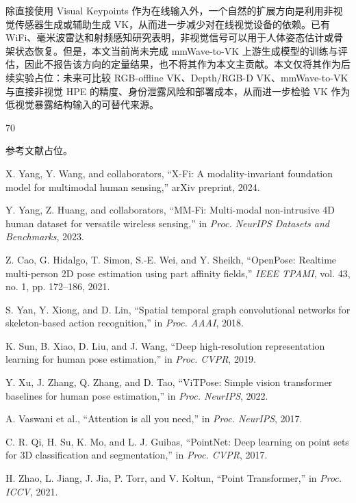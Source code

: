 \documentclass[journal]{IEEEtran}
\newcommand{\parahead}[1]{\vspace{0.4em}\noindent{\textbf{#1}}}
\begin{document}
\parahead{mmWave-to-VK 可行性占位实验。}
除直接使用 Visual Keypoints 作为在线输入外，一个自然的扩展方向是利用非视觉传感器生成或辅助生成 VK，从而进一步减少对在线视觉设备的依赖。已有 WiFi、毫米波雷达和射频感知研究表明，非视觉信号可以用于人体姿态估计或骨架状态恢复\cite{metafi,virteach,adapose,robustwifi,rfpose,mmwaveHar}。但是，本文当前尚未完成 mmWave-to-VK 上游生成模型的训练与评估，因此不报告该方向的定量结果，也不将其作为本文主贡献。本文仅将其作为后续实验占位：未来可比较 RGB-offline VK、Depth/RGB-D VK、mmWave-to-VK 与直接非视觉 HPE 的精度、身份泄露风险和部署成本，从而进一步检验 VK 作为低视觉暴露结构输入的可替代来源。

\begin{thebibliography}{70}

参考文献占位。

X. Yang, Y. Wang, and collaborators, ``X-Fi: A modality-invariant foundation model for multimodal human sensing,'' arXiv preprint, 2024.

Y. Yang, Z. Huang, and collaborators, ``MM-Fi: Multi-modal non-intrusive 4D human dataset for versatile wireless sensing,'' in \emph{Proc. NeurIPS Datasets and Benchmarks}, 2023.

Z. Cao, G. Hidalgo, T. Simon, S.-E. Wei, and Y. Sheikh, ``OpenPose: Realtime multi-person 2D pose estimation using part affinity fields,'' \emph{IEEE TPAMI}, vol. 43, no. 1, pp. 172--186, 2021.

S. Yan, Y. Xiong, and D. Lin, ``Spatial temporal graph convolutional networks for skeleton-based action recognition,'' in \emph{Proc. AAAI}, 2018.

K. Sun, B. Xiao, D. Liu, and J. Wang, ``Deep high-resolution representation learning for human pose estimation,'' in \emph{Proc. CVPR}, 2019.

Y. Xu, J. Zhang, Q. Zhang, and D. Tao, ``ViTPose: Simple vision transformer baselines for human pose estimation,'' in \emph{Proc. NeurIPS}, 2022.

A. Vaswani et al., ``Attention is all you need,'' in \emph{Proc. NeurIPS}, 2017.

C. R. Qi, H. Su, K. Mo, and L. J. Guibas, ``PointNet: Deep learning on point sets for 3D classification and segmentation,'' in \emph{Proc. CVPR}, 2017.

H. Zhao, L. Jiang, J. Jia, P. Torr, and V. Koltun, ``Point Transformer,'' in \emph{Proc. ICCV}, 2021.


\end{thebibliography}
\end{document}
